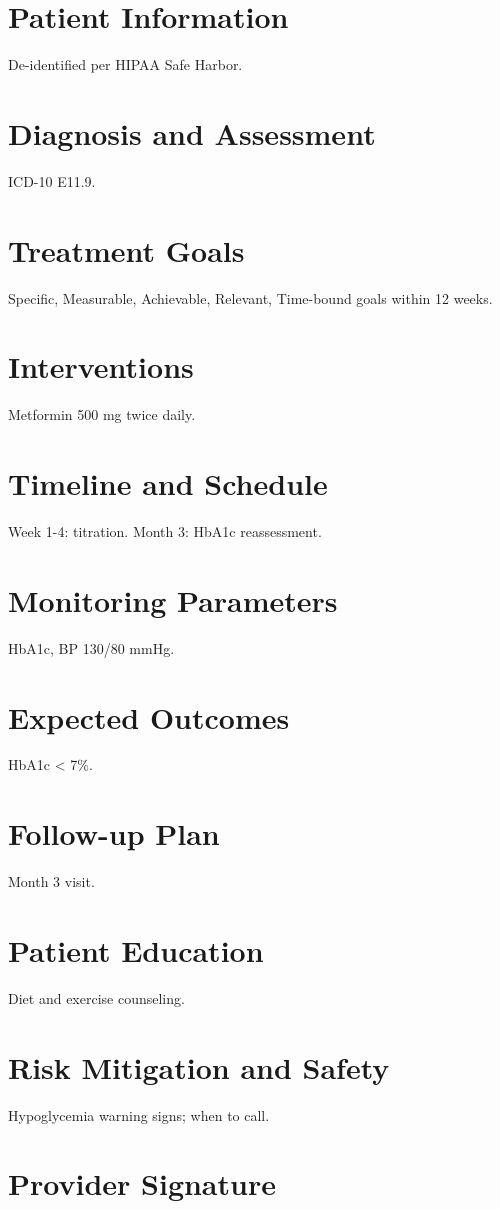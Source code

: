 \documentclass{article}
\begin{document}
\section*{Patient Information}
De-identified per HIPAA Safe Harbor.
\section*{Diagnosis and Assessment}
ICD-10 E11.9.
\section*{Treatment Goals}
Specific, Measurable, Achievable, Relevant, Time-bound goals within 12 weeks.
\section*{Interventions}
Metformin 500 mg twice daily.
\section*{Timeline and Schedule}
Week 1-4: titration. Month 3: HbA1c reassessment.
\section*{Monitoring Parameters}
HbA1c, BP 130/80 mmHg.
\section*{Expected Outcomes}
HbA1c < 7\%.
\section*{Follow-up Plan}
Month 3 visit.
\section*{Patient Education}
Diet and exercise counseling.
\section*{Risk Mitigation and Safety}
Hypoglycemia warning signs; when to call.
\section*{Provider Signature}
\end{document}
